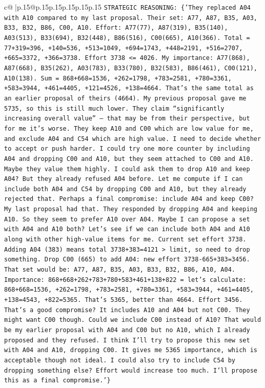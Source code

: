 \documentclass{article}
\begin{document}
{\begin{supertabular}{c@{$\;$}|p{.15\linewidth}@{}p{.15\linewidth}p{.15\linewidth}p{.15\linewidth}p{.15\linewidth}p{.15\linewidth}}
{{{                \texttt{STRATEGIC REASONING: \{'They replaced A04 with A10 compared to my last proposal. Their set: A77, A87, B35, A03, B33, B32, B86, C00, A10. Effort: A77(77), A87(319), B35(140), A03(513), B33(694), B32(448), B86(516), C00(665), A10(366). Total = 77+319=396, +140=536, +513=1049, +694=1743, +448=2191, +516=2707, +665=3372, +366=3738. Effort 3738 <= 4026. My importance: A77(868), A87(668), B35(262), A03(783), B33(780), B32(583), B86(461), C00(121), A10(138). Sum = 868+668=1536, +262=1798, +783=2581, +780=3361, +583=3944, +461=4405, +121=4526, +138=4664. That’s the same total as an earlier proposal of theirs (4664). My previous proposal gave me 5735, so this is still much lower. They claim “significantly increasing overall value” — that may be from their perspective, but for me it’s worse. They keep A10 and C00 which are low value for me, and exclude A04 and C54 which are high value. I need to decide whether to accept or push harder. I could try one more counter by including A04 and dropping C00 and A10, but they seem attached to C00 and A10. Maybe they value them highly. I could ask them to drop A10 and keep A04? But they already refused A04 before. Let me compute if I can include both A04 and C54 by dropping C00 and A10, but they already rejected that. Perhaps a final compromise: include A04 and keep C00? My last proposal had that. They responded by dropping A04 and keeping A10. So they seem to prefer A10 over A04. Maybe I can propose a set with A04 and A10 both? Let’s see if we can include both A04 and A10 along with other high{-}value items for me. Current set effort 3738. Adding A04 (383) means total 3738+383=4121 > limit, so need to drop something. Drop C00 (665) to add A04: new effort 3738{-}665+383=3456. That set would be: A77, A87, B35, A03, B33, B32, B86, A10, A04. Importance: 868+668+262+783+780+583+461+138+822 = let’s calculate: 868+668=1536, +262=1798, +783=2581, +780=3361, +583=3944, +461=4405, +138=4543, +822=5365. That’s 5365, better than 4664. Effort 3456. That’s a good compromise? It includes A10 and A04 but not C00. They might want C00 though. Could we include C00 instead of A10? That would be my earlier proposal with A04 and C00 but no A10, which I already proposed and they refused. I think I’ll try to propose this new set with A04 and A10, dropping C00. It gives me 5365 importance, which is acceptable though not ideal. I could also try to include C54 by dropping something else? Effort would increase too much. I’ll propose this as a final compromise.'\}} \\
\\ 
}}}
\end{supertabular}}
\end{document}
